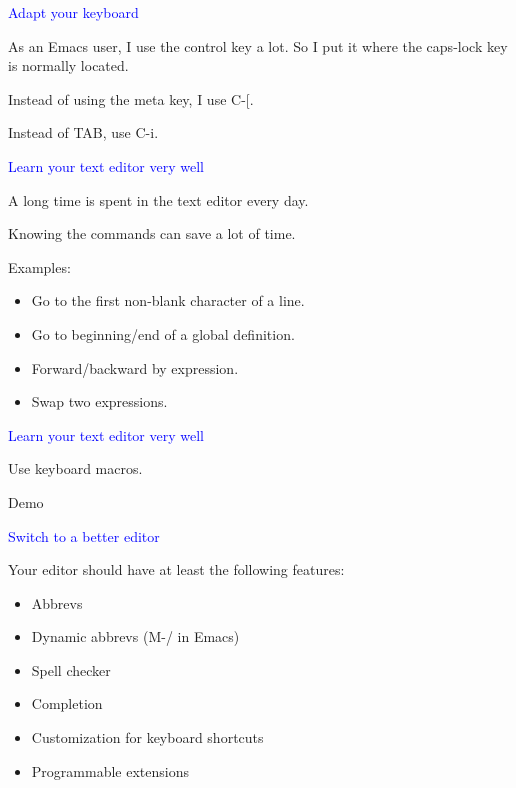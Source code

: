 \documentclass{slides}
\newcommand{\ti}[1]{\begin{center}\Large{\textcolor{blue}{#1}}\end{center}}
\begin{document}
\begin{slide}\ti{Adapt your keyboard}

As an Emacs user, I use the control key a lot.  So I put it where the
caps-lock key is normally located.  

Instead of using the meta key, I use C-[.

Instead of TAB, use C-i.

\vfill\end{slide}
\begin{slide}\ti{Learn your text editor very well}

A long time is spent in the text editor every day.

Knowing the commands can save a lot of time.

Examples:

\begin{itemize}
\item Go to the first non-blank character of a line.
\item Go to beginning/end of a global definition.
\item Forward/backward by expression.
\item Swap two expressions.
\end{itemize}

\vfill\end{slide}
\begin{slide}\ti{Learn your text editor very well}

Use keyboard macros.

Demo

\vfill\end{slide}
\begin{slide}\ti{Switch to a better editor}

Your editor should have at least the following features:

\begin{itemize}
\item Abbrevs
\item Dynamic abbrevs (M-/ in Emacs)
\item Spell checker
\item Completion
\item Customization for keyboard shortcuts
\item Programmable extensions
\end{itemize}

\vfill\end{slide}
\end{document}
